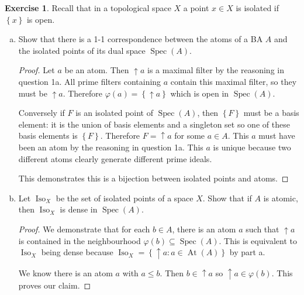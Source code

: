 \documentclass{article}
\DeclareMathOperator{\atoms}{At}
\newcommand{\set}[1]{\left\{#1\right\}}
\newcommand{\setwith}[2]{\set{#1:#2}}
\DeclareMathOperator{\spec}{Spec}
\DeclareMathOperator{\iso}{Iso}
\theoremstyle{definition}
\newtheorem{question}{Exercise}
\begin{document}
\begin{question}
    Recall that in a topological space \(X\) a point \(x\in X\) is isolated
    if \(\set{x}\) is open.

    \begin{enumerate}[a)]
        \item Show that there is a 1-1 correspondence between the atoms of a BA
              \(A\) and the isolated points of its dual space \(\spec(A)\).

              \begin{proof}
                  Let \(a\) be an atom. Then \(\uparrow a\) is a maximal filter
                  by the reasoning in question 1a. All prime filters containing
                  \(a\) contain this maximal filter, so they must be \(\uparrow
                  a\). Therefore \(\varphi(a)=\set{\uparrow a}\) which is open
                  in \(\spec(A)\).

                  Conversely if \(F\) is an isolated point of \(\spec(A)\), then
                  \(\set{F}\) must be a basis element: it is the union of basis
                  elements and a singleton set so one of these basis elements is
                  \(\set{F}\). Therefore \(F=\uparrow a\) for some \(a\in A\).
                  This \(a\) must have been an atom by the reasoning in question
                  1a. This \(a\) is unique because two different atoms clearly
                  generate different prime ideals.

                  This demonstrates this is a bijection between isolated points
                  and atoms.
              \end{proof}

        \item Let \(\iso_{X}\) be the set of isolated points of a space \(X\).
              Show that if \(A\) is atomic, then \(\iso_{X}\) is dense in
              \(\spec(A)\).

              \begin{proof}
                  We demonstrate that for each \(b\in A\), there is an atom
                  \(a\) such that \(\uparrow a\) is contained in the
                  neighbourhood \(\varphi(b)\subseteq\spec(A)\). This is
                  equivalent to \(\iso_{X}\) being dense because
                  \(\iso_{X}=\setwith{\uparrow a}{a\in\atoms(A)}\) by part a.

                  We know there is an atom \(a\) with \(a\leq b\). Then
                  \(b\in\uparrow a\) so \(\uparrow a\in\varphi(b)\). This proves
                  our claim.
              \end{proof}
    \end{enumerate}
\end{question}
\end{document}
